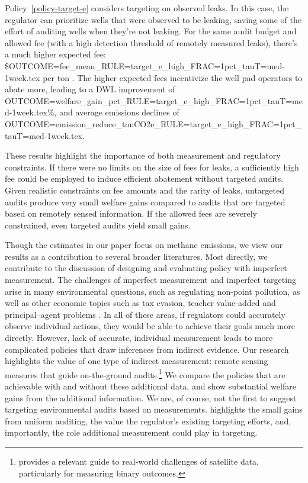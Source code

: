 \documentclass[12pt,oneside,letterpaper]{article}
\theoremstyle{definition}
\begin{document}
\begin{refsection}
Policy~\ref{policy-target-e} considers targeting on observed leaks.
In this case, the regulator can prioritize wells that were observed to be leaking, saving some of the effort of auditing wells when they're not leaking.
For the same audit budget and allowed fee (with a high detection threshold of remotely measured leaks), there's a much higher expected fee:
\${OUTCOME=fee_mean_RULE=target_e_high_FRAC=1pct_tauT=med-1week.tex} per ton .
The higher expected fees incentivize the well pad operators to abate more, leading to
a \gls{DWL} improvement of
{OUTCOME=welfare_gain_pct_RULE=target_e_high_FRAC=1pct_tauT=med-1week.tex}\%,
and average emissions declines of
{OUTCOME=emission_reduce_tonCO2e_RULE=target_e_high_FRAC=1pct_tauT=med-1week.tex}.


These results highlight the importance of both measurement and regulatory constraints.
If there were no limits on the size of fees for leaks, a sufficiently high fee could be employed to induce efficient abatement without targeted audits.
Given realistic constraints on fee amounts and the rarity of leaks, untargeted audits produce very small welfare gains compared to audits that are targeted based on remotely sensed information.
If the allowed fees are severely constrained, even targeted audits yield small gains.

Though the estimates in our paper focus on methane emissions, we view our results as a contribution to several broader literatures.
Most directly, we contribute to the discussion of designing and evaluating policy with imperfect measurement.
The challenges of imperfect measurement and imperfect targeting arise in many environmental questions, such as regulating non-point pollution, as well as other economic topics such as tax evasion, teacher value-added and principal--agent problems
\parencite{%
Harrington:1988,
Segerson:1988,
Allingham/Sandmo:1972,
Chetty/Friedman/Rockoff:2014,
Gilpatric/Vossler/McKee:2011,
gilpatric2015using,
cason2016regulatory,
oestreich2015firms,
Oestreich:2017,
}.
In all of these areas, if regulators could accurately observe individual actions, they would be able to achieve their goals much more directly.
However, lack of accurate, individual measurement leads to more complicated policies that draw inferences from indirect evidence.
Our research highlights the value of one type of indirect measurement: remote sensing measures that guide on-the-ground audits.\footnote{%
\textcite{AlixGarcia/Millimet:2022} provides a relevant guide to real-world challenges of satellite data, particularly for measuring binary outcomes.
}
We compare the policies that are achievable with and without these additional data, and show substantial welfare gains from the additional information.
We are, of course, not the first to suggest targeting environmental audits based on measurements.
\textcite{Duflo/Greenstone/Pande/Ryan:2018} highlights the small gains from uniform auditing, the value the regulator's existing targeting efforts, and, importantly, the role additional measurement could play in targeting.


\end{refsection}
\end{document}
